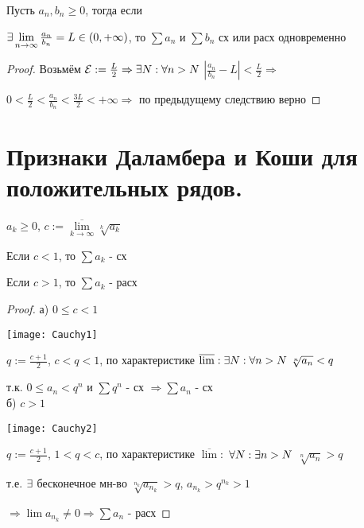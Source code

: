\documentclass[12pt, fleqn]{article}
\begin{document}
\begin{Property}[3]
\begin{Property}[4]
\begin{Property}[2, аддитивность]
\begin{consequence} 
    Пусть $a_n, b_n \geqslant 0$, тогда если 
    
    $\exists \lim\limits_{n \rightarrow \infty} \frac{a_n}{b_n} = L \in (0, + \infty)$, то $\sum a_n$ и $\sum b_n$ сх или расх одновременно
\end{consequence}

\begin{proof}
    Возьмём $\mathcal{E}:=\frac{L}{2} \Rightarrow \exists N: \forall n > N$ $|\frac{a_n}{b_n} - L| < \frac{L}{2} \Rightarrow$
    
    $0 < \frac{L}{2} < \frac{a_n}{b_n} < \frac{3L}{2} < +\infty \Rightarrow$ по предыдущему следствию верно
\end{proof}

\newpage
\section{Признаки Даламбера и Коши для положительных рядов.}
 
\begin{theorem} 
    $a_k \geqslant 0$, $c:=\overline{\lim\limits_{k \rightarrow \infty}} \sqrt[k]{a_k}$
    
    Если $c < 1$, то $\sum a_k$ - сх
    
    Если $c > 1$, то $\sum a_k$ - расх
\end{theorem}

\begin{proof}
    
    а) $0 \leqslant c < 1$
    
    \texttt{[image: Cauchy1]}
    
    $q := \frac{c+1}{2}$, $c<q<1$, по характеристике $\overline{\lim}: \exists N: \forall n > N\ \sqrt[n]{a_n} < q$
    
    т.к. $0 \leqslant a_n < q^n$ и $\sum q^n$ - сх $\Rightarrow \sum a_n$ - сх
    \\
    б) $c > 1$
    
    \texttt{[image: Cauchy2]}
    
    $q := \frac{c+1}{2}$, $1<q<c$, по характеристике $\overline{\lim}:$ $\forall N: \exists n > N$ $\sqrt[n]{a_n} > q$
    
    т.е. $\exists$ бесконечное мн-во $\sqrt[n_k]{a_{n_k}} > q$, $a_{n_k} > q^{n_k} > 1$
    
    $\Rightarrow \lim a_{n_k} \neq 0 \Rightarrow \sum a_n$ - расх
\end{proof}


\end{Property}
\end{Property}
\end{Property}
\end{document}
